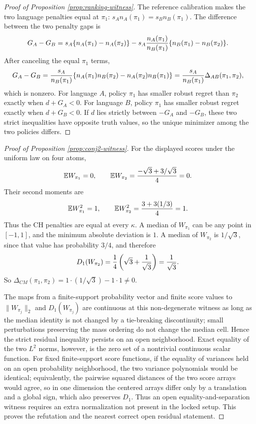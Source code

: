 \documentclass[11pt]{article}
\newcommand{\E}{\mathbb{E}}
\theoremstyle{definition}
\theoremstyle{plain}
\theoremstyle{remark}
\begin{document}
\begin{proof}[Proof of Proposition \ref{prop:ranking-witness}]
The reference calibration makes the two language penalties equal at $\pi_1$:
$s_A n_A(\pi_1)=s_B n_B(\pi_1)$.  The difference between the two penalty gaps is
\[
  G_A-G_B
  =
  s_A\{n_A(\pi_1)-n_A(\pi_2)\}
  -s_A{n_A(\pi_1)\over n_B(\pi_1)}
   \{n_B(\pi_1)-n_B(\pi_2)\}.
\]
After canceling the equal $\pi_1$ terms,
\[
  G_A-G_B
  =
  {s_A\over n_B(\pi_1)}
  \{n_A(\pi_1)n_B(\pi_2)-n_A(\pi_2)n_B(\pi_1)\}
  =
  {s_A\over n_B(\pi_1)}\Delta_{AB}(\pi_1,\pi_2),
\]
which is nonzero.  For language $A$, policy $\pi_1$ has smaller robust regret than
$\pi_2$ exactly when $d+G_A<0$.  For language $B$, policy $\pi_1$ has smaller robust
regret exactly when $d+G_B<0$.  If $d$ lies strictly between $-G_A$ and $-G_B$, these
two strict inequalities have opposite truth values, so the unique minimizer among the
two policies differs.
\end{proof}

\begin{proof}[Proof of Proposition \ref{prop:conj2-witness}]
For the displayed scores under the uniform law on four atoms,
\[
  \E W_{\pi_1}=0,\qquad
  \E W_{\pi_2}={-\sqrt3+3/\sqrt3\over 4}=0.
\]
Their second moments are
\[
  \E W_{\pi_1}^2=1,\qquad
  \E W_{\pi_2}^2={3+3(1/3)\over4}=1.
\]
Thus the CH penalties are equal at every $\kappa$.  A median of $W_{\pi_1}$ can be any
point in $[-1,1]$, and the minimum absolute deviation is $1$.  A median of
$W_{\pi_2}$ is $1/\sqrt3$, since that value has probability $3/4$, and therefore
\[
  D_1(W_{\pi_2})
  ={1\over4}\left(\sqrt3+{1\over\sqrt3}\right)
  ={1\over\sqrt3}.
\]
So $\Delta_{CM}(\pi_1,\pi_2)=1\cdot(1/\sqrt3)-1\cdot1\ne0$.

The maps from a finite-support probability vector and finite score values to
$\|W_{\pi_j}\|_2$ and $D_1(W_{\pi_j})$ are continuous at this non-degenerate witness
as long as the median identity is not changed by a tie-breaking discontinuity; small
perturbations preserving the mass ordering do not change the median cell.  Hence the
strict residual inequality persists on an open neighborhood.  Exact equality of the
two $L^2$ norms, however, is the zero set of a nontrivial continuous scalar function.
For fixed finite-support score functions, if the equality of variances held on an open
probability neighborhood, the two variance polynomials would be identical; equivalently,
the pairwise squared distances of the two score arrays would agree, so in one dimension
the centered arrays differ only by a translation and a global sign, which also preserves
$D_1$.  Thus an open equality-and-separation witness requires an extra normalization
not present in the locked setup.  This proves the refutation and the nearest correct
open residual statement.
\end{proof}
\end{document}
